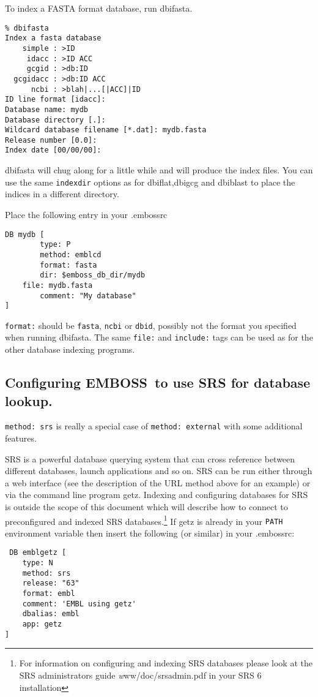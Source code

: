\documentclass{report}
\newcommand{\ilcomm}[1]{{\tt #1}}
\newcommand{\filename}[1]{{\sf\textsl #1}}
\newcommand{\progname}[1]{{\sc #1}}
\newcommand{\EMBOSS}{{\sf\bfseries EMBOSS}}
\begin{document}
To index a FASTA format database, run \progname{dbifasta}.
\begin{verbatim}
% dbifasta
Index a fasta database
    simple : >ID
     idacc : >ID ACC
     gcgid : >db:ID
  gcgidacc : >db:ID ACC
      ncbi : >blah|...[|ACC]|ID
ID line format [idacc]: 
Database name: mydb
Database directory [.]: 
Wildcard database filename [*.dat]: mydb.fasta
Release number [0.0]: 
Index date [00/00/00]: 
\end{verbatim}

\progname{dbifasta} will chug along for a little while and will produce the index files. You can use the same \ilcomm{indexdir} options as for \progname{dbiflat},\progname{dbigcg} and \progname{dbiblast}  to place the indices in a different directory.

Place the following entry in your \filename{.embossrc}

\begin{verbatim}
DB mydb [
        type: P
        method: emblcd
        format: fasta
        dir: $emboss_db_dir/mydb
	file: mydb.fasta
        comment: "My database"
]
\end{verbatim}

\ilcomm{format:} should be \ilcomm{fasta}, \ilcomm{ncbi} or \ilcomm{dbid}, possibly not the format you specified when running \progname{dbifasta}. The same \ilcomm{file:} and \ilcomm{include:} tags can be used as for the other database indexing programs.


\subsection{Configuring \EMBOSS\ to use SRS for database lookup.}

\ilcomm{method: srs} is really a special case of \ilcomm{method: external} with some additional features.

SRS is a powerful database querying system that can cross reference between different databases, launch applications and so on. SRS can be run either through a web interface (see the description of the URL method above for an example) or via the command line program \progname{getz}.
Indexing and configuring databases for SRS is outside the scope of this document which will describe how to connect to preconfigured and indexed SRS databases.\footnote{For information on configuring and indexing SRS databases please look at the SRS administrators guide \filename{www/doc/srsadmin.pdf} in your SRS 6 installation}
If \progname{getz} is already in your \ilcomm{PATH} environment variable then insert the following (or similar) in your \filename{.embossrc}:
\begin{verbatim}
 DB emblgetz [ 
    type: N 
    method: srs 
    release: "63" 
    format: embl
    comment: 'EMBL using getz' 
    dbalias: embl 
    app: getz 
]
\end{verbatim}
\end{document}
